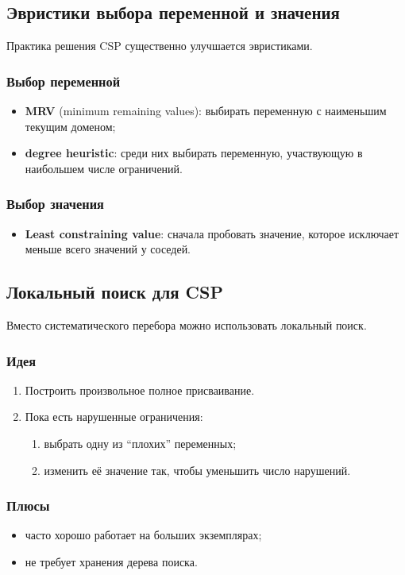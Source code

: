 \documentclass[12pt,a4paper]{article}
\theoremstyle{definition}
\theoremstyle{plain}
\begin{document}
\subsection{Эвристики выбора переменной и значения}
Практика решения CSP существенно улучшается эвристиками.

\subsubsection{Выбор переменной}
\begin{itemize}
\item \textbf{MRV} (minimum remaining values): выбирать переменную с наименьшим текущим доменом;
\item \textbf{degree heuristic}: среди них выбирать переменную, участвующую в наибольшем числе ограничений.
\end{itemize}

\subsubsection{Выбор значения}
\begin{itemize}
\item \textbf{Least constraining value}: сначала пробовать значение, которое исключает меньше всего значений у соседей.
\end{itemize}

\subsection{Локальный поиск для CSP}
Вместо систематического перебора можно использовать локальный поиск.

\subsubsection{Идея}
\begin{enumerate}
\item Построить произвольное полное присваивание.
\item Пока есть нарушенные ограничения:
\begin{enumerate}
\item выбрать одну из ``плохих'' переменных;
\item изменить её значение так, чтобы уменьшить число нарушений.
\end{enumerate}
\end{enumerate}

\subsubsection{Плюсы}
\begin{itemize}
\item часто хорошо работает на больших экземплярах;
\item не требует хранения дерева поиска.
\end{itemize}
\end{document}
